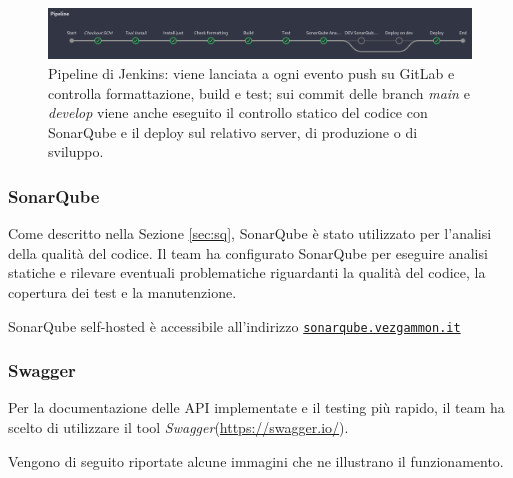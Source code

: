 \documentclass{article}
\begin{document}
\begin{figure}[H]
    \centering
    \includegraphics[width=1\textwidth]{report-jk_pipeline}
    \caption{Pipeline di Jenkins: viene lanciata a ogni evento push su GitLab e controlla formattazione, build e test; sui 
    commit delle branch \textit{main} e \textit{develop} viene anche eseguito il controllo statico del codice con SonarQube 
    e il deploy sul relativo server, di produzione o di sviluppo.}
    \label{fig:jk_pipeline}
\end{figure}

\subsubsection{SonarQube}
Come descritto nella Sezione \ref{sec:sq}, SonarQube è stato utilizzato per l'analisi della qualità del codice. Il team ha 
configurato SonarQube per eseguire analisi statiche e rilevare eventuali problematiche riguardanti la qualità del codice, 
la copertura dei test e la manutenzione.

SonarQube self-hosted è accessibile all'indirizzo \href{https://sonarqube.vezgammon.it}{\texttt{sonarqube.vezgammon.it}}

\newpage

\subsubsection{Swagger} \label{sec:swagger}

Per la documentazione delle API implementate e il testing più rapido, il team ha scelto di utilizzare il tool 
\textit{Swagger}(\url{https://swagger.io/}).

Vengono di seguito riportate alcune immagini che ne illustrano il funzionamento.
\end{document}
